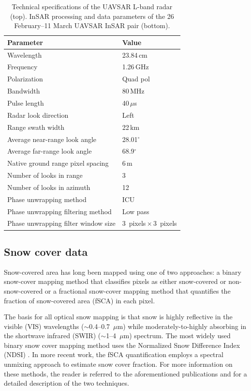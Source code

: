\begin{table}[t]
\centering
\label{tab:uavsar_specs}
\caption{Technical specifications of the UAVSAR L-band radar (top). InSAR processing and data parameters of the 26 February--11 March UAVSAR InSAR pair (bottom).}
\begin{tabular}{ll}
\toprule Parameter & Value \\
\midrule
Wavelength & 23.84\,cm \\
Frequency & 1.26\,GHz \\
Polarization & Quad pol \\
Bandwidth & 80\,MHz \\
Pulse length & 40\,$\mu$s \\
Radar look direction & Left \\
Range swath width & 22\,km \\
Average near-range look angle & 28.01$^{\circ}$\\
Average far-range look angle & 68.9$^{\circ}$\\
\midrule
Native ground range pixel spacing & 6\,m \\
Number of looks in range & 3 \\
Number of looks in azimuth & 12 \\
Phase unwrapping method & ICU \\
Phase unwrapping filtering method & Low pass \\
Phase unwrapping filter window size & 3~pixels\,$\times$\,3~pixels \\
\bottomrule
\end{tabular}
\end{table}


\hypertarget{ch4-methods-2}{\subsection{Snow cover data}\label{ch4-methods-2}}

Snow-covered area has long been mapped using one of two approaches: a binary snow-cover mapping method that classifies pixels as either snow-covered or non-snow-covered or a fractional snow-cover mapping method that quantifies the fraction of snow-covered area (fSCA) in each pixel. 

The basis for all optical snow mapping is that snow is highly reflective in the visible (VIS) wavelengths ($\sim$0.4--0.7~$\mu$m) while moderately-to-highly absorbing in the shortwave infrared (SWIR) ($\sim$1--4~$\mu$m) spectrum. The most widely used binary snow cover mapping method uses the Normalized Snow Difference Index (NDSI) \citep{dozierSpectralSignatureAlpine1989}. In more recent work, the fSCA quantification employs a spectral unmixing approach \citep{nolinMappingAlpineSnow1993,rosenthalAutomatedMappingMontane1996} to estimate snow cover fraction. For more information on these methods, the reader is referred to the aforementioned publications and \cite{stillingerLandsatMODISVIIRS2023} for a detailed description of the two techniques.

